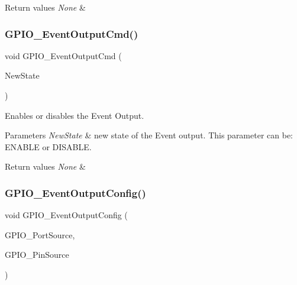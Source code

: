\begin{DoxyRetVals}{Return values}
{\em None} & \\
\hline
\end{DoxyRetVals}
\mbox{\label{group___g_p_i_o___private___functions_gaf13ab3d59e467df44b492f1cdfe2f588}} 
\subsubsection{\texorpdfstring{GPIO\_EventOutputCmd()}{GPIO\_EventOutputCmd()}}
{\footnotesize\ttfamily void G\+P\+I\+O\+\_\+\+Event\+Output\+Cmd (\begin{DoxyParamCaption}\item[{\mbox{\hyperlink{group___exported__types_gac9a7e9a35d2513ec15c3b537aaa4fba1}{Functional\+State}}}]{New\+State }\end{DoxyParamCaption})}



Enables or disables the Event Output. 


\begin{DoxyParams}{Parameters}
{\em New\+State} & new state of the Event output. This parameter can be\+: E\+N\+A\+B\+LE or D\+I\+S\+A\+B\+LE. \\
\hline
\end{DoxyParams}

\begin{DoxyRetVals}{Return values}
{\em None} & \\
\hline
\end{DoxyRetVals}
\mbox{\label{group___g_p_i_o___private___functions_ga935f31ed7a86c6cb594cf34313b4b7af}} 
\subsubsection{\texorpdfstring{GPIO\_EventOutputConfig()}{GPIO\_EventOutputConfig()}}
{\footnotesize\ttfamily void G\+P\+I\+O\+\_\+\+Event\+Output\+Config (\begin{DoxyParamCaption}\item[{uint8\+\_\+t}]{G\+P\+I\+O\+\_\+\+Port\+Source,  }\item[{uint8\+\_\+t}]{G\+P\+I\+O\+\_\+\+Pin\+Source }\end{DoxyParamCaption})}



